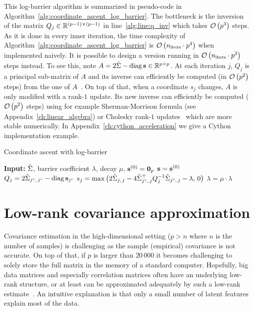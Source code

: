 \bigbreak
This log-barrier algorithm is summarized in pseudo-code in Algorithm~\ref{alg:coordinate_ascent_log_barrier}.
The bottleneck is the inversion of the matrix
$Q_j \in \mathbb{R}^{(p - 1) \times (p - 1)}$ in line~\ref{alg:line:q_inv} which takes $\mathcal{O}\left( p^3 \right)$ steps.
As it is done in every inner iteration, the time complexity of Algorithm~\ref{alg:coordinate_ascent_log_barrier} is
$\mathcal{O}\left( n_\text{iters} \cdot p^4 \right)$ when implemented naively.
It is possible to design a version running in $\mathcal{O}\left( n_\text{iters} \cdot p^3 \right)$ steps instead.
To see this, note $A = 2\hat{\Sigma} - \operatorname*{diag}\mathbf{s} \in \mathbb{R}^{p \times p}$.
At each iteration $j$, $Q_j$ is a principal sub-matrix of $A$ and its inverse can efficiently be computed
(in $\mathcal{O}\left( p^2 \right)$ steps) from the one of $A$~\citep{submatrix_inverse}.
On top of that, when a coordinate $s_j$ changes,
$A$ is only modified with a rank-$1$ update.
Its new inverse can efficiently be computed ($\mathcal{O}\left( p^2 \right)$ steps)
using for example Sherman-Morrison formula
(see Appendix~\ref{ch:linear_algebra})
or Cholesky rank-$1$ updates~\citep{cholesky_rank_1} which are more stable numerically.
In Appendix~\ref{ch:cython_acceleration} we give a Cython implementation example.
\begin{algorithm}[t]
    \caption{Coordinate ascent with log-barrier}\label{alg:coordinate_ascent_log_barrier}
    \begin{algorithmic}[1]
        \State \textbf{Input:} $\hat{\Sigma}$, barrier coefficient $\lambda$, decay $\mu$, $\mathbf{s}^{(0)} = \mathbf{0}_p$
        \State $\mathbf{s} = \mathbf{s}^{(0)}$
        \Repeat
        \State $Q_j = 2\hat{\Sigma}_{j^c,\, j^c} - \operatorname*{diag}\mathbf{s}_{j^c}$
        \State $s_j = \max\big( 2\hat{\Sigma}_{j,\, j} - 4\hat{\Sigma}_{j^c,\, j}^\top Q_j^{-1} \hat{\Sigma}_{j^c,\, j} - \lambda,\, 0 \big)$\label{alg:line:q_inv}
        \EndFor
        \State $\lambda = \mu \cdot \lambda$
    \end{algorithmic}
\end{algorithm}

\section{Low-rank covariance approximation}\label{sec:low_rank_sigma}

Covariance estimation in the high-dimensional setting ($p > n$ where $n$ is the number of samples)
is challenging as the sample (empirical) covariance is not accurate.
On top of that,
if $p$ is larger than $20\,000$ it becomes challenging to solely store the full matrix in the memory
of a standard computer.
Hopefully, big data matrices and especially correlation matrices often have an underlying low-rank structure,
or at least can be approximated adequately by such a low-rank estimate~\citep{big_data_low_rank}.
An intuitive explanation is that only a small number of latent features explain most of the data.

